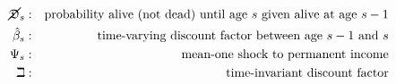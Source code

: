 \begin{eqnarray*}
        \cancel{\mathfrak{D}} _{s} &:&\text{probability alive (not dead) until age $s$ given alive at age $s-1$}
\\      {\hat{\beta}}_{s} &:&\text{time-varying discount factor between age $s-1$ and $s$}
\\     \Psi_{s} &:&\text{mean-one shock to permanent income}
\\     \beth &:&\text{time-invariant discount factor}
\end{eqnarray*}
